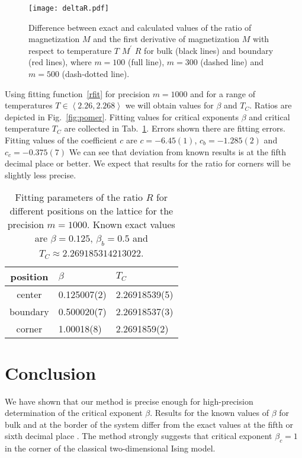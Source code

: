 \documentclass[showpacs,amssymb,twocolumn,floatfix,aps,pre,notitlepage]{revtex4-2}
\begin{document}
\begin{figure}[ht!]
\begin{center}
\texttt{[image: deltaR.pdf]}
\caption{Difference between exact and calculated values of the ratio of magnetization $M$ and the first derivative of magnetization $M$ with respect to temperature $T$ $M^{\prime}$ $R$ for bulk (black lines) and boundary (red lines), where $m = 100$ (full line), $m = 300$ (dashed line) and $m = 500$ (dash-dotted line).}
\label{fig:delR}
\end{center}
\end{figure}


 Using fitting function~\ref{rfit} for precision $m = 1000$ and for a range of temperatures $T\in\left\langle2.26,2.268\right\rangle$ we will obtain values for $\beta$ and $T_C$. Ratios are depicted in Fig.~\ref{fig:pomer}.  Fitting values for critical exponents $\beta$ and critical temperature $T_C$ are collected in Tab.~\ref{tabulka1}. Errors shown there are fitting errors. Fitting values of the coefficient $c$ are $c = -6.45(1)$, $c_b = -1.285(2)$ and $c_c = -0.375(7)$ We can see that deviation from known results is at the fifth decimal place or better. We expect that results for the ratio for corners will be slightly less precise.

\begin{table}[htb]
\begin{tabular}{| c | l | l |}
\hline
position & $\beta$ & $T_C$ \\
\hline\hline
center      & 0.125007(2) & 2.26918539(5) \\
\hline
boundary & 0.500020(7) & 2.26918537(3) \\
\hline
corner      & 1.00018(8) & 2.2691859(2) \\
\hline
\end{tabular}
\caption{Fitting parameters of the ratio $R$  for different positions on the lattice for the precision $ m = 1000$. Known exact values are $\beta = 0.125$, $\beta_b = 0.5$ and $T_C\approx 2.269185314213022$.}
\label{tabulka1}
\end{table}



\section{Conclusion}

We have shown that our method is precise enough for high-precision determination of the critical exponent $\beta$. Results for the known values of $\beta$ for bulk and at the border of the system differ from the exact values at the fifth or sixth decimal place . The method strongly suggests that critical exponent $\beta_c = 1$ in the corner of the classical two-dimensional Ising model.
\end{document}
